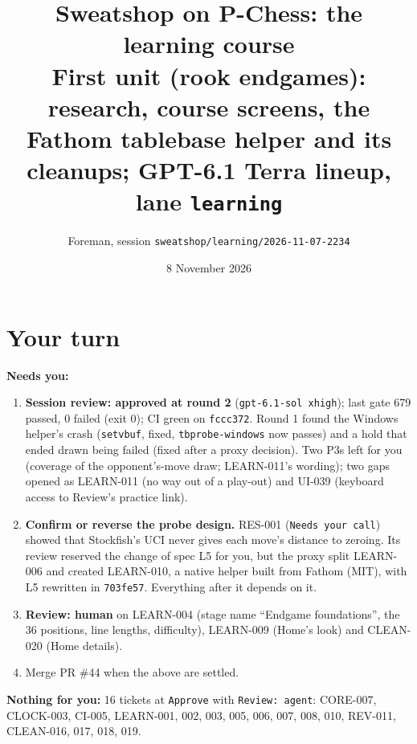 \documentclass[11pt,a4paper]{article}
\title{Sweatshop on P-Chess: the learning course\\\large First unit (rook endgames): research, course screens, the Fathom tablebase helper and its cleanups; GPT-6.1 Terra lineup, lane \texttt{learning}}
\author{Foreman, session \texttt{sweatshop/learning/2026-11-07-2234}}
\date{8 November 2026}
\begin{document}
\maketitle

\section*{Your turn}

\textbf{Needs you:}
\begin{enumerate}
  \item \textbf{Session review: approved at round 2} (\texttt{gpt-6.1-sol xhigh}); last gate 679 passed,
        0 failed (exit 0); CI green on \texttt{fccc372}. Round 1 found the Windows helper's crash
        (\texttt{setvbuf}, fixed, \texttt{tbprobe-windows} now passes) and a hold that ended drawn being
        failed (fixed after a proxy decision). Two P3s left for you (coverage of the opponent's-move
        draw; LEARN-011's wording); two gaps opened as LEARN-011 (no way out of a play-out) and UI-039
        (keyboard access to Review's practice link).
  \item \textbf{Confirm or reverse the probe design.} RES-001 (\texttt{Needs your call}) showed that
        Stockfish's UCI never gives each move's distance to zeroing. Its review reserved the change
        of spec L5 for you, but the proxy split LEARN-006 and created LEARN-010, a native helper
        built from Fathom (MIT), with L5 rewritten in \texttt{703fe57}. Everything after it depends on it.
  \item \textbf{Review: human} on LEARN-004 (stage name ``Endgame foundations'', the 36 positions,
        line lengths, difficulty), LEARN-009 (Home's look) and CLEAN-020 (Home details).
  \item Merge PR \#44 when the above are settled.
\end{enumerate}
\textbf{Nothing for you:} 16 tickets at \texttt{Approve} with \texttt{Review: agent}: CORE-007,
CLOCK-003, CI-005, LEARN-001, 002, 003, 005, 006, 007, 008, 010, REV-011, CLEAN-016, 017, 018, 019.
\end{document}
